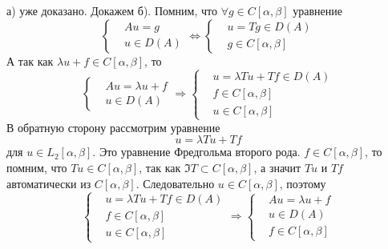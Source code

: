 \documentclass[14pt]{extarticle}
\begin{document}
\begin{Proof}
    а) уже доказано.
    Докажем б).
    Помним, что $\forall g \in C[\alpha, \beta]$ уравнение
    $$
    \left\{
    \begin{aligned}
        &Au = g\\
        &u \in D(A)
    \end{aligned}
    \right. \Leftrightarrow
    \left\{
    \begin{aligned}
        &u = Tg\in D(A)\\
        &g \in C[\alpha, \beta]
    \end{aligned}
    \right.
    $$
    А так как $\lambda u + f \in C[\alpha, \beta]$, то
    $$
    \left\{
    \begin{aligned}
        &A u = \lambda u + f\\
        &u \in D(A)
    \end{aligned}
    \right.
    \Rightarrow
    \left\{
    \begin{aligned}
        &u = \lambda T u  + T f \in D(A)\\
        &f \in C[\alpha, \beta]\\
        &u \in C[\alpha, \beta]
    \end{aligned}
    \right.
    $$
    В обратную сторону рассмотрим уравнение
    $$
    u = \lambda T u + T f
    $$
    для $u \in L_2[\alpha, \beta]$.
    Это уравнение Фредгольма второго рода.
    $f \in C[\alpha, \beta]$, то помним, что $T u \in C[\alpha, \beta]$, так как $\Im T \subset
    C[\alpha, \beta]$, а значит $Tu$ и $Tf$ автоматически из $C[\alpha, \beta]$.
    Следовательно $u \in C[\alpha, \beta]$, поэтому
    $$
    \left\{
    \begin{aligned}
        &u = \lambda T u  + T f \in D(A)\\
        &f \in C[\alpha, \beta]\\
        &u \in C[\alpha, \beta]
    \end{aligned}
    \right.
    \Rightarrow
     \left\{
    \begin{aligned}
        &A u = \lambda u + f\\
        &u \in D(A)\\
        &f \in C[\alpha, \beta]
    \end{aligned}
    \right.
    $$
    

\end{Proof}
\end{document}

